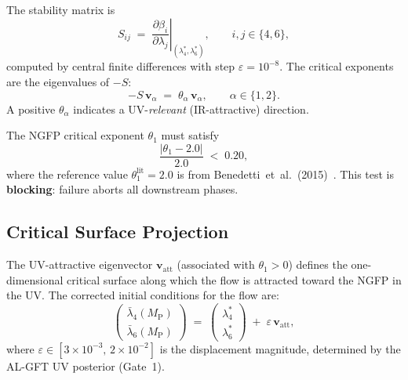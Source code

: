\documentclass[11pt,a4paper]{article}
\theoremstyle{definition}
\theoremstyle{plain}
\theoremstyle{remark}
\newcommand{\MP}{M_{\mathrm{P}}}
\begin{document}
The stability matrix is
\begin{equation}
  S_{ij} \;=\;
  \left.\frac{\partial\beta_i}{\partial\lambda_j}\right|_{(\lambda_4^*,\lambda_6^*)},
  \qquad i,j\in\{4,6\},
  \label{eq:stability}
\end{equation}
computed by central finite differences with step $\varepsilon=10^{-8}$.
The critical exponents are the eigenvalues of $-S$:
\begin{equation}
  -S\,\mathbf{v}_\alpha \;=\; \theta_\alpha\,\mathbf{v}_\alpha,
  \qquad \alpha\in\{1,2\}.
  \label{eq:crit_exp}
\end{equation}
A positive $\theta_\alpha$ indicates a UV-\emph{relevant}
(IR-attractive) direction.

\begin{passcriterion}[title=Literature Cross-Check (Phase 0.5)]
The NGFP critical exponent $\theta_1$ must satisfy
\begin{equation}
  \frac{|\theta_1 - 2.0|}{2.0} \;<\; 0.20,
  \label{eq:fp_pass}
\end{equation}
where the reference value $\theta_1^{\text{lit}}=2.0$ is from
Benedetti~et~al.~(2015)~\cite{benedetti2015}.
This test is \textbf{blocking}: failure aborts all downstream phases.
\end{passcriterion}

\subsection{Critical Surface Projection}

The UV-attractive eigenvector $\mathbf{v}_{\text{att}}$ (associated with
$\theta_1>0$) defines the one-dimensional critical surface along which
the flow is attracted toward the NGFP in the UV.  The corrected initial
conditions for the flow are:
\begin{equation}
  \begin{pmatrix} \bar\lambda_4(\MP) \\ \bar\lambda_6(\MP) \end{pmatrix}
  \;=\;
  \begin{pmatrix} \lambda_4^* \\ \lambda_6^* \end{pmatrix}
  \;+\;
  \varepsilon\,\mathbf{v}_{\text{att}},
  \label{eq:crit_proj}
\end{equation}
where $\varepsilon\in[3\times10^{-3},\,2\times10^{-2}]$ is the
displacement magnitude, determined by the AL-GFT UV posterior (Gate~1).


\end{document}
